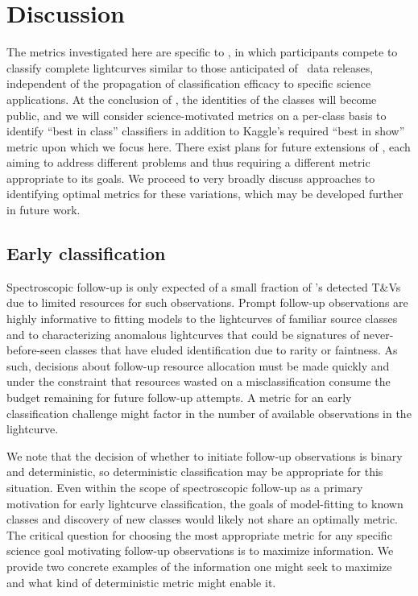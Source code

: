 \section{Discussion}
\label{sec:discussion}

The metrics investigated here are specific to \plasticc, in which participants compete to classify complete lightcurves similar to those anticipated of \lsst\ data releases, independent of the propagation of classification efficacy to specific science applications.
At the conclusion of \plasticc, the identities of the classes will become public, and we will consider science-motivated metrics on a per-class basis to identify ``best in class'' classifiers in addition to Kaggle's required ``best in show'' metric upon which we focus here.
There exist plans for future extensions of \plasticc, each aiming to address different problems and thus requiring a different metric appropriate to its goals.
We proceed to very broadly discuss approaches to identifying optimal metrics for these variations, which may be developed further in future work.

\subsection{Early classification}
\label{sec:early}

Spectroscopic follow-up is only expected of a small fraction of \lsst's detected T\&Vs due to limited resources for such observations.
Prompt follow-up observations are highly informative to fitting models to the lightcurves of familiar source classes and to characterizing anomalous lightcurves that could be signatures of never-before-seen classes that have eluded identification due to rarity or faintness.
As such, decisions about follow-up resource allocation must be made quickly and under the constraint that resources wasted on a misclassification consume the budget remaining for future follow-up attempts.
A metric for an early classification challenge might factor in the number of available observations in the lightcurve.

We note that the decision of whether to initiate follow-up observations is binary and deterministic, so deterministic classification may be appropriate for this situation.
Even within the scope of spectroscopic follow-up as a primary motivation for early lightcurve classification, the goals of model-fitting to known classes and discovery of new classes would likely not share an optimally metric.
The critical question for choosing the most appropriate metric for any specific science goal motivating follow-up observations is to maximize information.
We provide two concrete examples of the information one might seek to maximize and what kind of deterministic metric might enable it.


